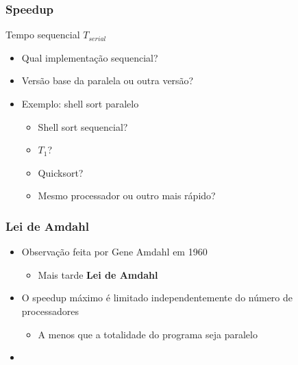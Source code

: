 \documentclass[xcolor={usenames,dvipsnames},12pt,presentation,aspectratio=169]{beamer}
\begin{document}
\begin{frame}[fragile]
  \frametitle{Speedup}
  \begin{block}{Tempo sequencial $T_{serial}$}
    \begin{itemize}
      \item Qual implementação sequencial?
      \item Versão base da paralela ou outra versão?
    \end{itemize}
  \end{block}
\begin{itemize}
  \item Exemplo: shell sort paralelo
  \begin{itemize}
    \item Shell sort sequencial?
    \item $T_1$?
    \item Quicksort?
    \item Mesmo processador ou outro mais rápido?
  \end{itemize}
\end{itemize}
\end{frame}
\begin{frame}[fragile]
  \frametitle{Lei de Amdahl}
\begin{itemize}
  \item Observação feita por Gene Amdahl em 1960
  \begin{itemize}
    \item Mais tarde \textbf{Lei de Amdahl}
  \end{itemize}
  \item O speedup máximo é limitado independentemente do número de processadores
  \begin{itemize}
    \item A menos que a totalidade do programa seja paralelo
  \end{itemize}
  \item 
\end{itemize}
\end{frame}
\end{document}

